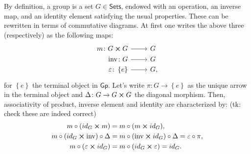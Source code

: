 \documentclass[../Main]{subfiles}
\begin{document}
\begin{rem}[]
	By definition, a group is a set $G \in \mathsf{Sets}$, endowed with an operation,
	an inverse map, and an identity element satisfying the usual properties.
	These can be rewritten in terms of commutative diagrams.
	At first one writes the above three (respectively) as the following maps:
	\begin{equation}
	\begin{tikzcd}[row sep = 0ex
		,/tikz/column 1/.append style={anchor=base east}
		,/tikz/column 2/.append style={anchor=base west}]
		m\colon G \cross G \arrow[r, "", rightarrow] &
		G \\
		\mathrm{inv} \colon G \arrow[r, "", rightarrow] &
		G \\
		\varepsilon \colon \left\{ e \right\} \arrow[r, "", rightarrow] &
		G,
	\end{tikzcd}
	\end{equation} 
	for $\left\{ e \right\}$ the terminal object in $\mathsf{Gp}$.
	Let's write $\pi\colon G \to \left\{ e \right\}$
	as the unique arrow in the terminal object
	and $\Delta\colon G \to G \cross G$ the diagonal morphism.
	Then, associativity of product, inverse element and
	identity are characterized by: (tk: check these are indeed correct)
	\begin{align}\label{eq:GroupAxioms}
		m \circ (id_G \cross m) &= m \circ (m \cross id_G),\\
		m \circ (id_G \cross \mathrm{inv}) \circ \Delta &=
		m \circ (\mathrm{inv} \cross id_G) \circ \Delta = \varepsilon \circ \pi,\\
		m \circ (\varepsilon \cross id_G) &=
		m \circ (id_G \cross \varepsilon) = id_G
	.\end{align} 
\end{rem}
\end{document}
